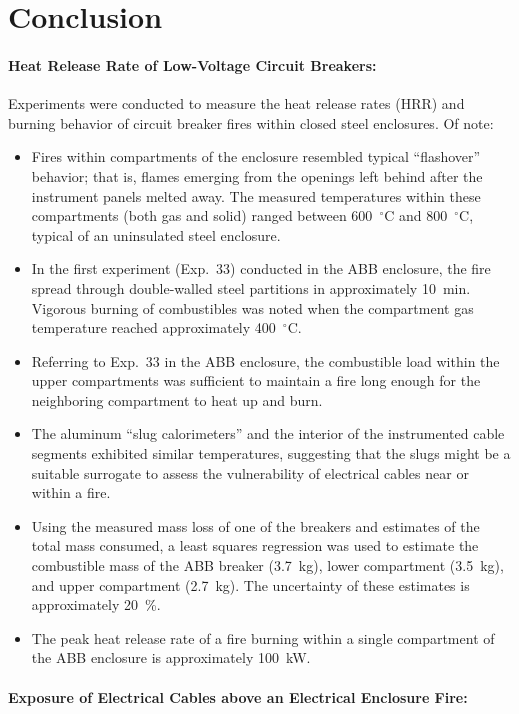 \clearpage

\section{Conclusion}

\paragraph{Heat Release Rate of Low-Voltage Circuit Breakers:}

Experiments were conducted to measure the heat release rates (HRR) and burning behavior of circuit breaker fires within closed steel enclosures. Of note:
\begin{itemize}
\item Fires within compartments of the enclosure resembled typical  ``flashover'' behavior; that is, flames emerging from the openings left behind after the instrument panels melted away. The measured temperatures within these compartments (both gas and solid) ranged between 600~$^\circ$C and 800~$^\circ$C, typical of an uninsulated steel enclosure.
\item In the first experiment (Exp.~33) conducted in the ABB enclosure, the fire spread through double-walled steel partitions in approximately 10~min. Vigorous burning of combustibles was noted when the compartment gas temperature reached approximately 400~$^\circ$C.
\item Referring to Exp.~33 in the ABB enclosure, the combustible load within the upper compartments was sufficient to maintain a fire long enough for the neighboring compartment to heat up and burn.
\item The aluminum ``slug calorimeters'' and the interior of the instrumented cable segments exhibited similar temperatures, suggesting that the slugs might be a suitable surrogate to assess the vulnerability of electrical cables near or within a fire.
\item Using the measured mass loss of one of the breakers and estimates of the total mass consumed, a least squares regression was used to estimate the combustible mass of the ABB breaker (3.7~kg), lower compartment (3.5~kg), and upper compartment (2.7~kg). The uncertainty of these estimates is approximately 20~\%.
\item The peak heat release rate of a fire burning within a single compartment of the ABB enclosure is approximately 100~kW.
\end{itemize}


\paragraph{Exposure of Electrical Cables above an Electrical Enclosure Fire:}

